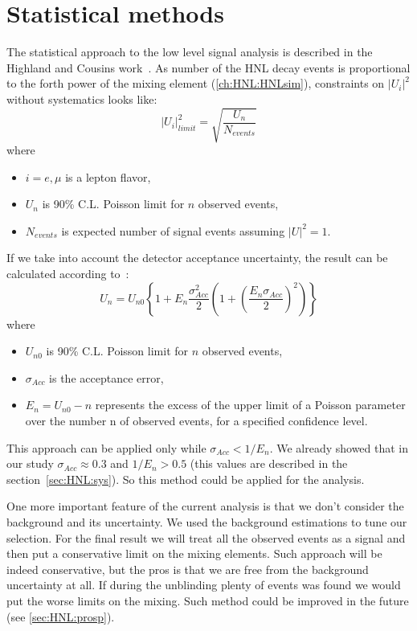 \documentclass[../main.tex]{subfiles}
\begin{document}
\section{Statistical methods}
\label{sec:HNL:stat}
The statistical approach to the low level signal analysis is described in the Highland and Cousins work~\cite{Cousins1992}. As number of the HNL decay events is proportional to the forth power of the mixing element (\autoref{ch:HNL:HNLsim}), constraints on $\left|U_i\right|^2$ without systematics looks like:
\begin{equation}
  \left|U_i\right|^2_{limit}=\sqrt{\frac{U_n}{N_{events}}}
  \label{eq:HNL:constraints}
\end{equation}
where
\begin{itemize}
    \item $i=e,\mu$ is a lepton flavor,
    \item $U_n$ is 90\% C.L. Poisson limit for $n$ observed events,
    \item $N_{events}$ is expected number of signal events assuming $\left|U\right|^2=1$.
\end{itemize}
If we take into account the detector acceptance uncertainty, the result can be calculated according to~\cite{Cousins1992}:
\begin{equation}
  U_n=U_{n0}\left\{1+E_n\frac{\sigma^2_{Acc}}{2}\left(1+\left(\frac{E_n\sigma_{Acc}}{2}\right)^2\right)\right\}
  \label{eq:HNL:constrainsAcc}
\end{equation}
where
\begin{itemize}
    \item $U_{n0}$ is 90\% C.L. Poisson limit for $n$ observed events,
    \item $\sigma_{Acc}$ is the acceptance error,
    \item $E_n=U_{n0}-n$ represents the excess of the upper limit of a Poisson parameter over the number n of observed events, for a specified confidence level.
\end{itemize}
This approach can be applied only while $\sigma_{Acc}<1/E_n$. We already showed that in our study $\sigma_{Acc}\approx0.3$ and $1/E_n>0.5$ (this values are described in the section~\ref{sec:HNL:sys}). So this method could be applied for the analysis.

One more important feature of the current analysis is that we don't consider the background and its uncertainty. We used the background estimations to tune our selection. For the final result we will treat all the observed events as a signal and then put a conservative limit on the mixing elements. Such approach will be indeed conservative, but the pros is that we are free from the background uncertainty at all. If during the unblinding plenty of events was found we would put the worse limits on the mixing. Such method could be improved in the future (see \autoref{sec:HNL:prosp}).
\end{document}
